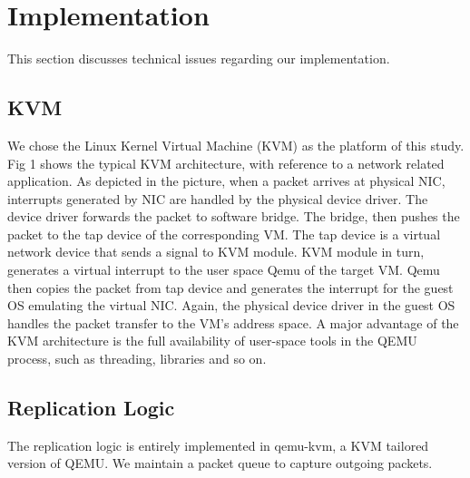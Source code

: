  \section{Implementation} \label{sec:impl}

This section discusses technical issues regarding our implementation.

\subsection{KVM}\label{sec:kvm}
We chose the Linux Kernel Virtual Machine (KVM) as the platform of this study.
Fig 1 shows the typical KVM architecture, with reference to a network related 
application. As depicted in the picture, when a packet arrives at physical NIC, 
interrupts generated by NIC are handled by the physical device driver. The device 
driver forwards the packet to software bridge. The bridge, then pushes the packet 
to the tap device of the corresponding VM. The tap device is a virtual network 
device that sends a signal to KVM module. KVM module in turn, generates a virtual 
interrupt to the user space Qemu of the target VM. Qemu then copies the packet from 
tap device and generates the interrupt for the guest OS emulating the virtual NIC. 
Again, the physical device driver in the guest OS handles the packet transfer to 
the VM’s address space. A major advantage of the KVM architecture is the full 
availability of user-space tools in the QEMU process, such as threading, libraries 
and so on.
\subsection{Replication Logic}\label{sec:Replication}
The replication logic is entirely implemented in qemu-kvm, a KVM tailored version of QEMU.
We maintain a packet queue to capture outgoing packets.
